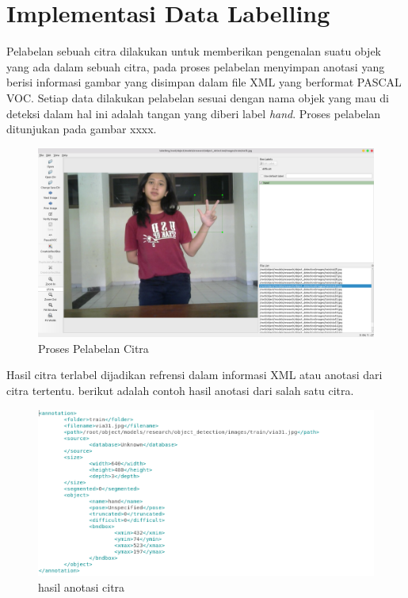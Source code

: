 \section{Implementasi Data Labelling}
Pelabelan sebuah citra dilakukan untuk memberikan pengenalan suatu objek yang ada dalam sebuah citra, pada proses pelabelan menyimpan anotasi yang berisi informasi gambar yang disimpan dalam file XML yang berformat PASCAL VOC. Setiap data dilakukan pelabelan sesuai dengan nama objek yang mau di deteksi dalam hal ini adalah tangan yang diberi label \textit{hand}. Proses pelabelan ditunjukan pada gambar xxxx.
\begin{figure}[H]
	\centering
	\includegraphics[width=0.8\linewidth]{viany}
	\caption{Proses Pelabelan Citra}
	\label{fig:viany}
\end{figure}
Hasil citra terlabel dijadikan refrensi dalam informasi XML atau anotasi dari citra tertentu. berikut adalah contoh hasil anotasi dari salah satu citra.
\begin{figure}[H]
	\centering
	\includegraphics[width=0.8\linewidth]{anotasi}
	\caption{hasil anotasi citra}
	\label{fig:anotasi}
\end{figure}
